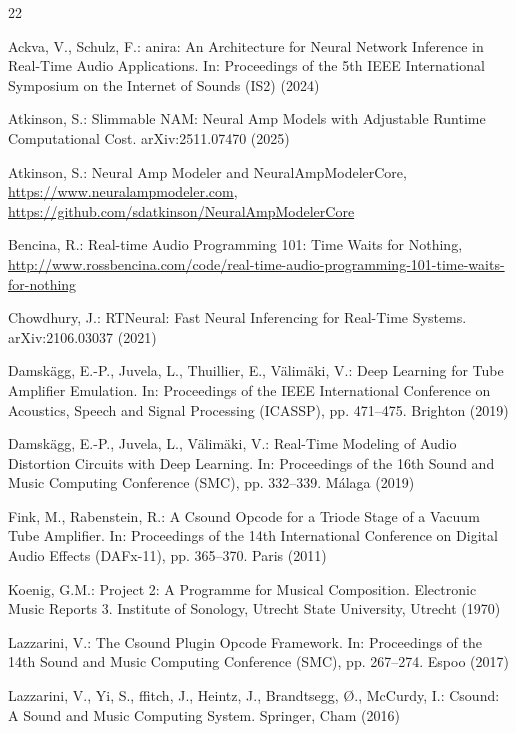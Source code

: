 \documentclass[runningheads,a4paper]{llncs}
\begin{document}
\begin{thebibliography}{22}

 Ackva, V., Schulz, F.: anira: An Architecture
for Neural Network Inference in Real-Time Audio Applications. In:
Proceedings of the 5th IEEE International Symposium on the Internet of
Sounds (IS2) (2024)

 Atkinson, S.: Slimmable NAM: Neural Amp
Models with Adjustable Runtime Computational Cost. arXiv:2511.07470 (2025)

 Atkinson, S.: Neural Amp Modeler and NeuralAmpModelerCore,
\url{https://www.neuralampmodeler.com},
\url{https://github.com/sdatkinson/NeuralAmpModelerCore}

 Bencina, R.: Real-time Audio Programming
101: Time Waits for Nothing,
\url{http://www.rossbencina.com/code/real-time-audio-programming-101-time-waits-for-nothing}

 Chowdhury, J.: RTNeural: Fast Neural
Inferencing for Real-Time Systems. arXiv:2106.03037 (2021)

 Damsk\"agg, E.-P., Juvela, L., Thuillier, E.,
V\"alim\"aki, V.: Deep Learning for Tube Amplifier Emulation. In:
Proceedings of the IEEE International Conference on Acoustics, Speech and
Signal Processing (ICASSP), pp. 471--475. Brighton (2019)

 Damsk\"agg, E.-P., Juvela, L.,
V\"alim\"aki, V.: Real-Time Modeling of Audio Distortion Circuits with
Deep Learning. In: Proceedings of the 16th Sound and Music Computing
Conference (SMC), pp. 332--339. M\'alaga (2019)

 Fink, M., Rabenstein, R.: A Csound Opcode for a
Triode Stage of a Vacuum Tube Amplifier. In: Proceedings of the 14th
International Conference on Digital Audio Effects (DAFx-11), pp. 365--370.
Paris (2011)

 Koenig, G.M.: Project 2: A Programme for
Musical Composition. Electronic Music Reports 3. Institute of Sonology,
Utrecht State University, Utrecht (1970)

 Lazzarini, V.: The Csound Plugin Opcode
Framework. In: Proceedings of the 14th Sound and Music Computing
Conference (SMC), pp. 267--274. Espoo (2017)

 Lazzarini, V., Yi, S., ffitch, J., Heintz,
J., Brandtsegg, {\O}., McCurdy, I.: Csound: A Sound and Music Computing
System. Springer, Cham (2016)


\end{thebibliography}
\end{document}
